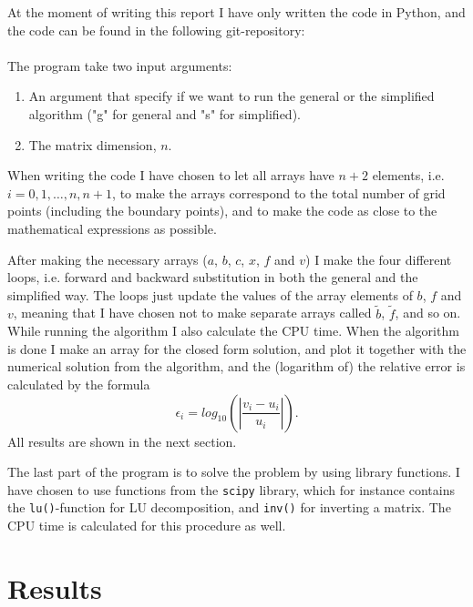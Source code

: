 \documentclass[12pt, a4paper]{article}
\begin{document}
At the moment of writing this report I have only written the code in Python, and the code can be found in 
the following git-repository: \vspace{0.5cm} \\ 
 \vspace{0.5cm} \\ 
The program take two input arguments: 
\begin{enumerate}
\item An argument that specify if we want to run the general or the simplified algorithm ("g" for 
general and "s" for simplified). 
\item The matrix dimension, $n$. 
\end{enumerate}  

When writing the code I have chosen to let all arrays have $n+2$ elements, i.e. $i = 0,1,\dots,n,n+1$, to 
make the arrays correspond to the total number of grid points (including the boundary points), and 
to make the code as close to the mathematical expressions as possible.

After making the necessary arrays ($a$, $b$, $c$, $x$, $f$ and $v$) I make the four different loops, i.e. 
forward and backward substitution in both the general and the simplified way. The loops just update the 
values of the array elements of $b$, $f$ and $v$, meaning that I have chosen not to make separate arrays 
called $\tilde{b}$, $\tilde{f}$, and so on. While running the algorithm I also calculate the CPU time. 
When the algorithm is done I make an array for the closed form solution, and plot it together with the 
numerical solution from the algorithm, and the (logarithm of) the relative error is calculated by the
formula
\begin{equation}
\epsilon_i = log_{10}\left(\left| \frac{v_i - u_i}{u_i} \right| \right). 
\label{eq:error}
\end{equation}
All results are shown in the next section. 
   
The last part of the program is to solve the problem by using library functions. I have chosen to use 
functions from the \texttt{scipy} library, which for instance contains the \texttt{lu()}-function for 
LU decomposition, and \texttt{inv()} for inverting a matrix. The CPU time is calculated for this procedure 
as well.  


\section{Results}
\end{document}
